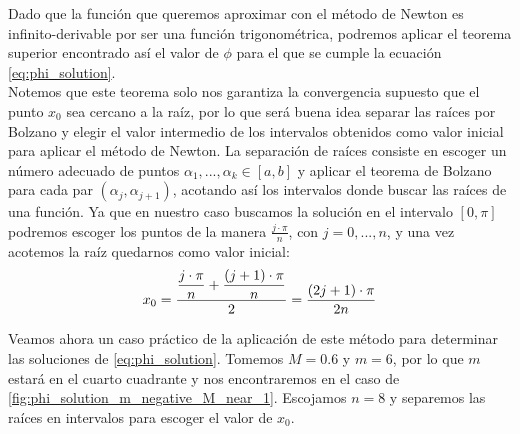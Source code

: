 Dado que la función que queremos aproximar con el método de Newton es infinito-derivable por ser una función trigonométrica, podremos aplicar el teorema superior encontrado así el valor de $\phi$ para el que se cumple la ecuación \eqref{eq:phi_solution}.\\

Notemos que este teorema solo nos garantiza la convergencia supuesto que el punto $x_0$ sea cercano a la raíz, por lo que será buena idea separar las raíces por Bolzano y elegir el valor intermedio de los intervalos obtenidos como valor inicial para aplicar el método de Newton. La separación de raíces consiste en escoger un número adecuado de puntos $\alpha_1,...,\alpha_k\in[a,b]$ y aplicar el teorema de Bolzano para cada par $(\alpha_j,\alpha_{j+1})$, acotando así los intervalos donde buscar las raíces de una función. Ya que en nuestro caso buscamos la solución en el intervalo $[0,\pi]$ podremos escoger los puntos de la manera $\frac{j\cdot \pi}{n}$, con $j=0,...,n$, y una vez acotemos la raíz quedarnos como valor inicial:
\[
x_0=\frac{\displaystyle \frac{\displaystyle j\cdot\pi}{\displaystyle n}+\frac{\displaystyle (j+1)\cdot\pi}{\displaystyle n}}{\displaystyle 2}=\frac{\displaystyle (2j+1)\cdot\pi}{\displaystyle 2n}
\]

Veamos ahora un caso práctico de la aplicación de este método para determinar las soluciones de \eqref{eq:phi_solution}. Tomemos $M=0.6$ y $m=6$, por lo que $m$ estará en el cuarto cuadrante y nos encontraremos en el caso de \ref{fig:phi_solution_m_negative_M_near_1}. Escojamos $n=8$ y separemos las raíces en intervalos para escoger el valor de $x_0$.
\begin{table}[H]
\centering
{}
\end{table}

